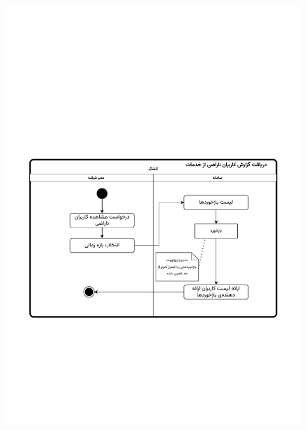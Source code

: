 \begin{figure}[ht!]
	\centering
	\includegraphics[scale=0.8, page=1]{figs/OOD-activity-angry.pdf}
\end{figure}
\FloatBarrier
\newpage


